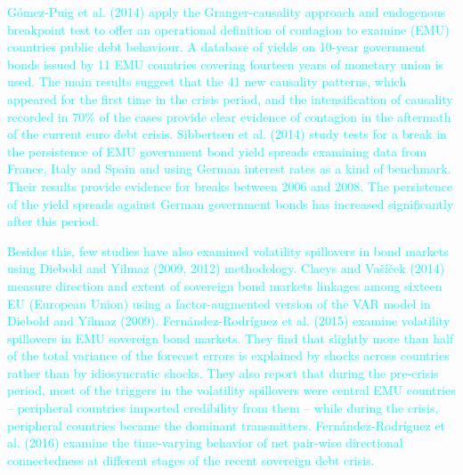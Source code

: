 \documentclass[12pt,bibliography=totoc]{article}
\begin{document}
\textcolor{cyan}{Gómez-Puig et al. (2014) apply the Granger-causality approach and endogenous breakpoint test to offer an operational definition of contagion to examine (EMU) countries public debt behaviour. A database of yields on 10-year government bonds issued by 11 EMU countries covering fourteen years of monetary union is used. The main results suggest that the 41 new causality patterns, which appeared for the first time in the crisis period, and the intensification of causality recorded in 70\% of the cases provide clear evidence of contagion in the aftermath of the current euro debt crisis. Sibbertsen et al. (2014) study tests for a break in the persistence of EMU government bond yield spreads examining data from France, Italy and Spain and using German interest rates as a kind of benchmark. Their results provide evidence for breaks between 2006 and 2008. The persistence of the yield spreads against German government bonds has increased significantly after this period.}

\textcolor{cyan}{Besides this, few studies have also examined volatility spillovers in bond markets using Diebold and Yilmaz (2009, 2012) methodology. Claeys and Vašíček (2014) measure direction and extent of sovereign bond markets linkages among sixteen EU (European Union) using a factor-augmented version of the VAR model in Diebold and Yilmaz (2009). Fernández-Rodríguez et al. (2015) examine volatility spillovers in EMU sovereign bond markets. They find that slightly more than half of the total variance of the forecast errors is explained by shocks across countries rather than by idiosyncratic shocks. They also report that during the pre-crisis period, most of the triggers in the volatility spillovers were central EMU countries – peripheral countries imported credibility from them – while during the crisis, peripheral countries became the dominant transmitters. Fernández-Rodríguez et al. (2016) examine the time-varying behavior of net pair-wise directional connectedness at different stages of the recent sovereign debt crisis.}
\end{document}
